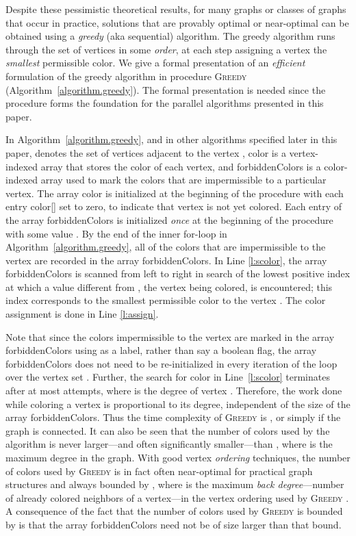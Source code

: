 \documentclass{article}
\begin{document}
Despite these pessimistic theoretical results,
for many graphs or classes of graphs that occur in practice, solutions that are provably optimal
or near-optimal can be obtained using a {\em greedy} (aka sequential) algorithm.
The greedy algorithm runs through the set of vertices in some {\em order}, at each step 
assigning a vertex the {\em smallest} permissible color. 
We give a formal presentation of an {\em efficient} formulation of the greedy algorithm
in procedure \textsc{Greedy} (Algorithm~\ref{algorithm.greedy}).
The formal presentation is needed  since the procedure forms the foundation for the 
parallel algorithms presented  in this paper.

In Algorithm~\ref{algorithm.greedy}, and in other algorithms specified later in this paper, 
 denotes the set of vertices adjacent to the vertex ,
\textsf{color} is a vertex-indexed array that stores the color of each vertex,
and \textsf{forbiddenColors} is a color-indexed array used to mark the colors that are 
impermissible to a particular vertex. 
The array \textsf{color} is initialized at the beginning of the procedure with 
each entry \textsf{color}[] set to zero, to indicate that vertex 
is not yet colored.
Each entry of the array \textsf{forbiddenColors} is
initialized {\em once} at the beginning of the procedure
with some value .
By the end of the inner for-loop in Algorithm~\ref{algorithm.greedy},
all of the colors that are impermissible to the vertex  are recorded in the
array \textsf{forbiddenColors}.
In Line \ref{l:scolor}, the array \textsf{forbiddenColors} is scanned from 
left to right in search of the lowest positive index  at which a value different from ,
the vertex being colored, is encountered; this index corresponds to the smallest permissible color
 to the vertex . The color assignment is done in Line \ref{l:assign}.

Note that since the colors impermissible to the vertex  are marked in the array 
\textsf{forbiddenColors} using  as a label, rather than say a boolean flag,  
the array \textsf{forbiddenColors} does not need to be re-initialized in every iteration of 
the loop over the vertex set . Further, the search for color in Line~\ref{l:scolor} terminates
after at most  attempts, where  is the degree of vertex .
Therefore, the work done while coloring a vertex  is proportional to 
its degree, independent of the size of the array \textsf{forbiddenColors}.
Thus the time complexity of \textsc{Greedy} is , 
or simply  if the graph is connected.
It can also be seen that the number of colors used by the algorithm 
is never larger---and often significantly smaller---than  , 
where  is the maximum degree in the graph.
With good vertex {\em ordering} techniques, the 
number of colors used by \textsc{Greedy} is in fact often near-optimal for
practical graph structures and always bounded by , where  is
the maximum {\em back degree}---number of already colored neighbors of a vertex---in 
the vertex ordering used by \textsc{Greedy} \cite{colpack-acm}.
A consequence of the fact that the number of colors used by \textsc{Greedy} is 
bounded by  is that the array \textsf{forbiddenColors} need not be of 
size larger than that bound.
\end{document}
